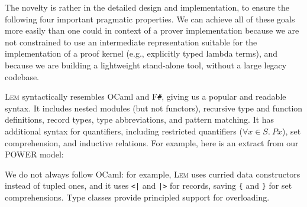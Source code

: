 \documentclass[a4paper]{llncs}
\newcommand{\myparagraph}[1]{\vspace{0.5\baselineskip}\par\noindent{\normalsize\bfseries{#1}}\quad}
\newcommand{\toolname}{\textsc{Lem}}
\begin{document}
The novelty is rather in the detailed design and implementation,
to ensure the following four important pragmatic properties. 
We can achieve all of these
goals more easily than one could in context of a  prover implementation because we are not constrained to
use an intermediate representation suitable for the implementation of a
proof kernel (e.g., explicitly typed lambda terms), and because we
are building a lightweight stand-alone tool, without a large legacy codebase.



\myparagraph{1. Readability of source files}
\toolname{} syntactically resembles OCaml and F\texttt{\#}, 
giving us a popular and readable syntax.
It includes nested modules (but not functors), 
recursive type and function definitions, record types, type abbreviations, and
pattern matching.
  It has additional
syntax for quantifiers, including restricted quantifiers ($\forall x \in S.\ P x$),
set comprehension, and inductive relations.
For example, here is an extract from our POWER model:

\vspace*{-2.2mm}
\par{}

\vspace*{-2.2mm}

\noindent We do not always follow OCaml: for example, \toolname{} 
uses curried data constructors
instead of tupled ones, and it uses \verb+<|+ and \verb+|>+ for records, 
saving \verb|{| and \verb|}| for set comprehensions.
%
Type classes provide principled support for overloading.
\end{document}
